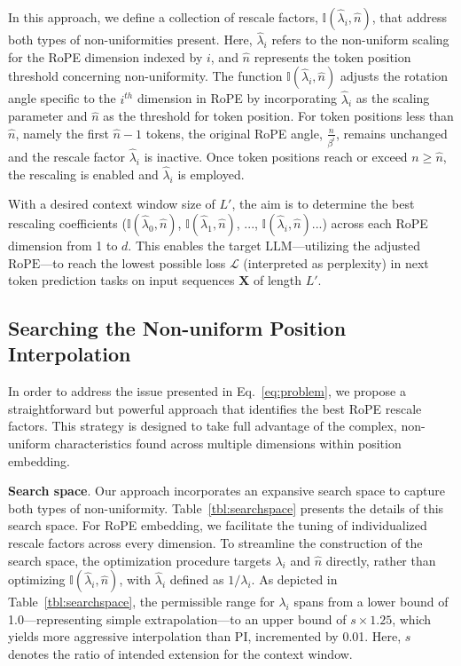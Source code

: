 In this approach, we define a collection of rescale factors, $\mathbb{I}(\hat{\lambda}_{i},\hat{n})$, that address both types of non-uniformities present. Here, $\hat{\lambda}_i$ refers to the non-uniform scaling for the RoPE dimension indexed by $i$, and $\hat{n}$ represents the token position threshold concerning non-uniformity. The function $\mathbb{I}(\hat{\lambda}_{i},\hat{n})$ adjusts the rotation angle specific to the $i^{th}$ dimension in RoPE by incorporating $\hat\lambda_{i}$ as the scaling parameter and $\hat{n}$ as the threshold for token position. For token positions less than $\hat{n}$, namely the first $\hat{n}-1$ tokens, the original RoPE angle, $\frac{n}{\beta^i}$, remains unchanged and the rescale factor $\hat\lambda_{i}$ is inactive. Once token positions reach or exceed $n \ge \hat{n}$, the rescaling is enabled and $\hat\lambda_{i}$ is employed.

With a desired context window size of $L'$, the aim is to determine the best rescaling coefficients ($\mathbb{I}(\hat{\lambda}_{0},\hat{n})$, $\mathbb{I}(\hat{\lambda}_{1},\hat{n})$, ..., $\mathbb{I}(\hat{\lambda}_{i},\hat{n})$...) across each RoPE dimension from 1 to $d$. This enables the target $\text{LLM}$—utilizing the adjusted $\text{RoPE}$—to reach the lowest possible loss $\mathcal{L}$ (interpreted as perplexity) in next token prediction tasks on input sequences $\mathbf{X}$ of length $L'$.

\subsection{Searching the Non-uniform Position Interpolation}

In order to address the issue presented in Eq.~\ref{eq:problem}, we propose a straightforward but powerful approach that identifies the best RoPE rescale factors. This strategy is designed to take full advantage of the complex, non-uniform characteristics found across multiple dimensions within position embedding.

\textbf{Search space}. Our approach incorporates an expansive search space to capture both types of non-uniformity. Table~\ref{tbl:searchspace} presents the details of this search space. For RoPE embedding, we facilitate the tuning of individualized rescale factors across every dimension. To streamline the construction of the search space, the optimization procedure targets $\lambda_i$ and $\hat{n}$ directly, rather than optimizing $\mathbb{I}(\hat{\lambda}_{i},\hat{n})$, with $\hat{\lambda}_{i}$ defined as $1/\lambda_i$. As depicted in Table~\ref{tbl:searchspace}, the permissible range for $\lambda_i$ spans from a lower bound of 1.0—representing simple extrapolation—to an upper bound of $s\times1.25$, which yields more aggressive interpolation than PI, incremented by 0.01. Here, $s$ denotes the ratio of intended extension for the context window.

